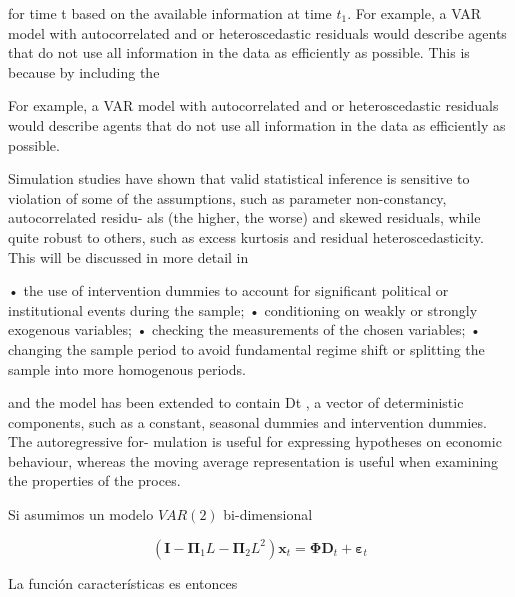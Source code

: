 \documentclass[12pt, twoside]{book}\usepackage[]{graphicx}\usepackage[]{color}
\numberwithin{equation}{section}
\numberwithin{theorem}{section}
\numberwithin{teorema}{section}
\numberwithin{defi}{section}
\numberwithin{prop}{section}
\numberwithin{defi}{section}
\theoremstyle{plain}
\begin{document}
for time t based on the available information at time $t_1$. For example, a VAR model
with autocorrelated and or heteroscedastic residuals would describe agents that do not
use all information in the data as efficiently as possible. This is because by including the

 For example, a VAR model
with autocorrelated and or heteroscedastic residuals would describe agents that do not
use all information in the data as efficiently as possible. 

Simulation studies have shown that valid statistical inference is sensitive to violation
of some of the assumptions, such as parameter non-constancy, autocorrelated residu-
als (the higher, the worse) and skewed residuals, while quite robust to others, such as
excess kurtosis and residual heteroscedasticity. This will be discussed in more detail in


• the use of intervention dummies to account for significant political or institutional
events during the sample;
• conditioning on weakly or strongly exogenous variables;
• checking the measurements of the chosen variables;
• changing the sample period to avoid fundamental regime shift or splitting the sample
into more homogenous periods.

and the model has been extended to contain Dt , a vector of deterministic components,
such as a constant, seasonal dummies and intervention dummies. The autoregressive for-
mulation is useful for expressing hypotheses on economic behaviour, whereas the moving average representation is useful when examining the properties of the proces.

Si asumimos un modelo $VAR(2)$ bi-dimensional

\begin{equation}
(\mathbf{I}-\boldsymbol{\Pi}_{1}L-\boldsymbol{\Pi}_{2}L^{2})\mathbf{x}_{t} = \boldsymbol{\Phi}\mathbf{D}_{t}+\mathbf{\varepsilon}_{t}
\end{equation}

La función características es entonces 
\end{document}
